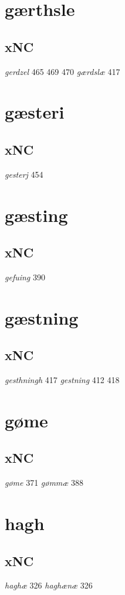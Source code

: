\documentclass[a4paper,twocolumn]{article}
\begin{document}
\section{gærthsle}
\label{sec:org8e35aa5}
\subsection{xNC}
\label{sec:org931d5cc}
\emph{gerdzel} 465 469 470 \emph{gærdslæ} 417 
\section{gæsteri}
\label{sec:orgd2a122c}
\subsection{xNC}
\label{sec:orge72d11e}
\emph{gesterj} 454 
\section{gæsting}
\label{sec:org364b2d1}
\subsection{xNC}
\label{sec:org22b0341}
\emph{gefuing} 390 
\section{gæstning}
\label{sec:org0780fe0}
\subsection{xNC}
\label{sec:org6d2a60e}
\emph{gesthningh} 417 \emph{gestning} 412 418 
\section{gøme}
\label{sec:orgccfb889}
\subsection{xNC}
\label{sec:orgaa2c451}
\emph{gøme} 371 \emph{gømmæ} 388 
\section{hagh}
\label{sec:org01f6680}
\subsection{xNC}
\label{sec:org8a7207f}
\emph{haghæ} 326 \emph{haghænæ} 326 
\end{document}
